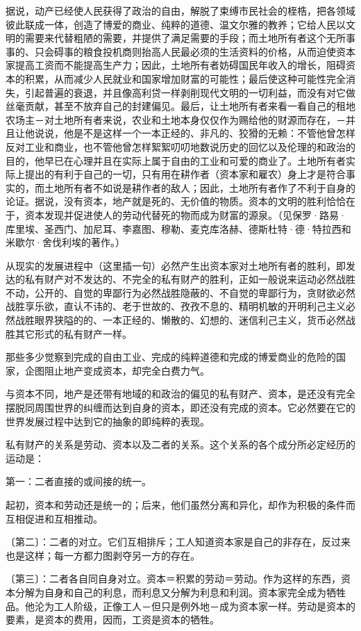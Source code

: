 \documentclass[a4paper,twoside,12pt,AutoFakeBold]{ctexart}
\begin{document}
据说，动产已经使人民获得了政治的自由，解脱了束缚市民社会的桎梏，把各领域彼此联成一体，创造了博爱的商业、纯粹的道德、温文尔雅的教养；它给人民以文明的需要来代替粗陋的需要，并提供了满足需要的手段；而土地所有者这个无所事事的、只会碍事的粮食投机商则抬高人民最必须的生活资料的价格，从而迫使资本家提高工资而不能提高生产力；因此，土地所有者妨碍国民年收入的增长，阻碍资本的积累，从而减少人民就业和国家增加财富的可能性；最后使这种可能性完全消失，引起普遍的衰退，并且像高利贷一样剥削现代文明的一切利益，而没有对它做丝毫贡献，甚至不放弃自己的封建偏见。最后，让土地所有者来看一看自己的租地农场主－对土地所有者来说，农业和土地本身仅仅作为赐给他的财源而存在，－并且让他说说，他是不是这样一个一本正经的、非凡的、狡猾的无赖：不管他曾怎样反对工业和商业，也不管他曾怎样絮絮叨叨地数说历史的回忆以及伦理的和政治的目的，他早已在心理并且在实际上属于自由的工业和可爱的商业了。土地所有者实际上提出的有利于自己的一切，只有用在耕作者（资本家和雇农）身上才是符合事实的，而土地所有者不如说是耕作者的敌人；因此，土地所有者作了不利于自身的论证。据说，没有资本，地产就是死的、无价值的物质。资本的文明的胜利恰恰在于，资本发现并促进使人的劳动代替死的物而成为财富的源泉。（见保罗·路易·库里埃、圣西门、加尼耳、李嘉图、穆勒、麦克库洛赫、德斯杜特·德·特拉西和米歇尔·舍伐利埃的著作。）

从现实的发展进程中（这里插一句）必然产生出资本家对土地所有者的胜利，即发达的私有财产对不发达的、不完全的私有财产的胜利，正如一般说来运动必然战胜不动，公开的、自觉的卑鄙行为必然战胜隐蔽的、不自觉的卑鄙行为，贪财欲必然战胜享乐欲，直认不讳的、老于世故的、孜孜不息的、精明机敏的开明利己主义必然战胜眼界狭隘的的、一本正经的、懒散的、幻想的、迷信利己主义，货币必然战胜其它形式的私有财产一样。

那些多少觉察到完成的自由工业、完成的纯粹道德和完成的博爱商业的危险的国家，企图阻止地产变成资本，却完全白费力气。

与资本不同，地产是还带有地域的和政治的偏见的私有财产、资本，是还没有完全摆脱同周围世界的纠缠而达到自身的资本，即还没有完成的资本。它必然要在它的世界发展过程中达到它的抽象的即纯粹的表现。

私有财产的关系是劳动、资本以及二者的关系。这个关系的各个成分所必定经历的运动是：

第一：二者直接的或间接的统一。

起初，资本和劳动还是统一的；后来，他们虽然分离和异化，却作为积极的条件而互相促进和互相推动。

〔第二〕：二者的对立。它们互相排斥；工人知道资本家是自己的非存在，反过来也是这样；每一方都力图剥夺另一方的存在。

〔第三〕：二者各自同自身对立。资本＝积累的劳动＝劳动。作为这样的东西，资本分解为自身和自己的利息，而利息又分解为利息和利润。资本家完全成为牺牲品。他沦为工人阶级，正像工人－但只是例外地－成为资本家一样。劳动是资本的要素，是资本的费用，因而，工资是资本的牺牲。
\end{document}
